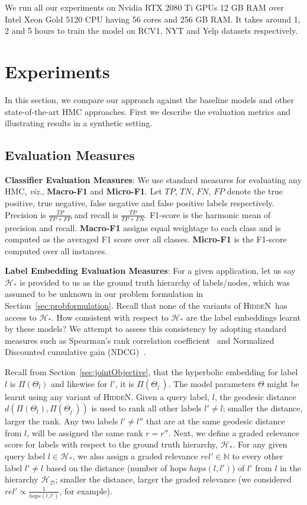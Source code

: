 \documentclass[11pt,a4paper]{article}
\newcommand{\model}{\mbox{\textsc{HiddeN}}}
\begin{document}
We run all our experiments on Nvidia RTX 2080 Ti GPUs 12 GB RAM over Intel Xeon Gold 5120 CPU having 56 cores and 256 GB RAM. It takes around 1, 2 and 5 hours to train the model on RCV1, NYT and Yelp datasets respectively.

\section{Experiments}\label{sec:sim}
In this section, we compare our approach against the baseline models and other state-of-the-art HMC approaches. First we describe the evaluation metrics and illustrating results in a synthetic setting.

\subsection{Evaluation Measures}

\textbf{Classifier Evaluation Measures}: We use standard measures for evaluating any HMC, {\em viz.}, \textbf{Macro-F1} and \textbf{Micro-F1}. Let $TP$, $TN$, $FN$, $FP$ denote the true positive, true negative, false negative and false positive labels respectively. Precision is $\frac{TP}{TP+FP}$ and recall is $\frac{TP}{TP+FN}$. F1-score is the harmonic mean of precision and recall. \textbf{Macro-F1} assigns equal weightage to each class and is computed as the averaged F1 score over all classes. \textbf{Micro-F1} is the F1-score computed over all instances.

\noindent \textbf{Label Embedding Evaluation Measures}:
For a given application, let us say $\mathcal{H}_{*}$ is provided to us as the ground truth hierarchy of labels/nodes, which was assumed to be unknown in our problem formulation in Section~\ref{sec:probformulation}. Recall that none of the variants of \model\ has access to $\mathcal{H}_{*}$. How consistent with respect to $\mathcal{H}_{*}$ are the label embeddings learnt by these models? We attempt to assess this consistency by adopting standard measures such as Spearman's rank correlation coefficient~\citep{zar2005spearman} and Normalized Discounted cumulative gain (NDCG)~\cite{dcg}. 

Recall from Section~\ref{sec:jointObjective}, that the hyperbolic embedding for label $l$ is $\Pi\left(\Theta_l\right)$ and likewise for $l'$, it is $\Pi\left(\Theta_{l^\prime}\right)$. The model parameters $\Theta$ might be learnt using any variant of \model. Given a query label, $l$, the geodesic distance $d(\Pi\left(\Theta_{l}\right),\Pi\left(\Theta_{l^\prime}\right))$ is used to rank all other labels $l'\ne l$; smaller the distance, larger the rank. Any two labels $l'\ne l''$ that are at the same geodesic distance from $l$, will be assigned the same rank $r = r''$. Next, we define a graded relevance score for labels with respect to the ground truth hierarchy, $\mathcal{H}_{*}$. 
For any given query label $l \in \mathcal{H}_{*}$, we also assign a graded relevance $rel' \in \mathbb{N}$ to every other label $l' \ne l$  based on the distance (number of hops $hops(l,l')$) of $l'$ from $l$ in the hierarchy $\mathcal{H}_\mathcal{D}$; smaller the distance, larger the graded relevance (we considered $rel' \propto \frac{1}{hops(l,l')}$, for example).
\end{document}
